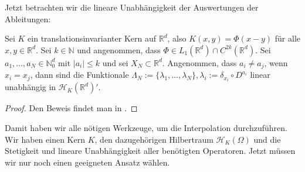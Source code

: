 Jetzt betrachten wir die lineare Unabhängigkeit der Auswertungen der Ableitungen:

\begin{theorem}
\label{linUn}
Sei $K$ ein translationsinvarianter Kern auf $\mathbb{R}^d$, also $K(x,y) = \Phi (x-y)$ für alle $x,y \in \mathbb{R}^d$. Sei $k \in \mathbb{N}$ und angenommen, dass $\Phi \in L_1(\mathbb{R}^d) \cap C^{2k}(\mathbb{R}^d)$. Sei $a_1, \dots, a_N \in \mathbb{N}_0^d$ mit $|a_i| \le k$ und sei $X_N \subset \mathbb{R}^d$. Angenommen, dass $a_i \neq a_j$, wenn $x_i = x_j$, dann sind die Funktionale $\Lambda_N := \{\lambda_1, \dots, \lambda_N\}, \lambda_i := \delta_{x_i} \circ D^{a_i}$ linear unabhängig in $\mathcal{H}_K(\mathbb{R}^d)'$.
\end{theorem}

\begin{proof}
Den Beweis findet man in \textcite[Theorem 16.4]{Wendland.2005}.
\end{proof}


Damit haben wir alle nötigen Werkzeuge, um die Interpolation durchzuführen. Wir haben einen Kern $K$, den dazugehörigen Hilbertraum $\mathcal{H}_K(\Omega)$ und die Stetigkeit und lineare Unabhängigkeit aller benötigten Operatoren. Jetzt müssen wir nur noch einen geeigneten Ansatz wählen.